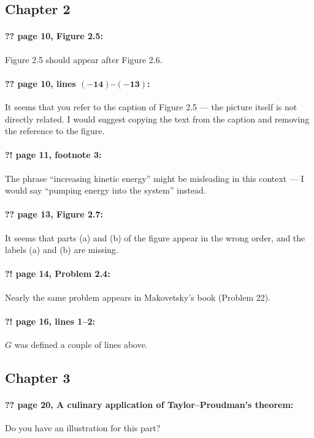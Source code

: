 \documentclass[twoside]{article}
\begin{document}
\subsection*{Chapter 2}

\paragraph{?? page 10, Figure 2.5:} Figure 2.5 should appear after Figure 2.6.

\paragraph{?? page 10, lines $\bm{(-14)}$--$\bm{(-13)}$:} It seems that you refer to the caption of Figure 2.5 — the picture itself is not directly related. I would suggest copying the text from the caption and removing the reference to the figure.

\paragraph{?! page 11, footnote 3:} The phrase “increasing kinetic energy” might be misleading in this context — I would say “pumping energy into the system” instead.

\paragraph{?? page 13, Figure 2.7:} It seems that parts (a) and (b) of the figure appear in the wrong order, and the labels (a) and (b) are missing.

\paragraph{?! page 14, Problem 2.4:} Nearly the same problem appears in Makovetsky’s book (Problem 22).

\paragraph{?! page 16, lines 1--2:} $G$ was defined a couple of lines above.

\subsection*{Chapter 3}

\paragraph{?? page 20, A culinary application of Taylor--Proudman’s theorem:} Do you have an illustration for this part?
\end{document}
